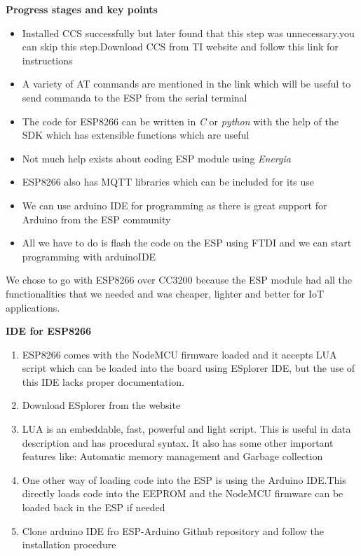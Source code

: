 \documentclass[16pt]{article}
\begin{document}
{\Large{\textbf{Progress stages and key points}}}

\begin{itemize}

\item
  Installed CCS successfully but later found that this step was unnecessary.you can skip this step.Download CCS from TI website and follow this link for instructions
\item
  A variety of AT commands are mentioned in the link which will be
  useful to send commanda to the ESP from the serial terminal
\item
  The code for ESP8266 can be written in \emph{C} or \emph{python} with
  the help of the SDK which has extensible functions which are useful
\item
  Not much help exists about coding ESP module using \emph{Energia}
\item
  ESP8266 also has MQTT libraries which can be included for its use
\item
  We can use arduino IDE for programming as there is great support for
  Arduino from the ESP community
\item
  All we have to do is flash the code on the ESP using FTDI and we can
  start programming with arduinoIDE
  
\end{itemize}

We chose to go with ESP8266 over CC3200 because the ESP module had all
the functionalities that we needed and was cheaper, lighter and better
for IoT applications.

\vspace{5.5cm}

{\LARGE{\textbf{IDE for ESP8266}}}

\begin{enumerate}

\item
  ESP8266 comes with the NodeMCU firmware loaded and it accepts LUA
  script which can be loaded into the board using ESplorer IDE, but the
  use of this IDE lacks proper documentation.
\item
  Download ESplorer from the website 
\item
  LUA is an embeddable, fast, powerful and light script. This is useful in data
  description and has procedural syntax. It also has some other
  important features like: Automatic memory management and Garbage
  collection
\item
  One other way of loading code into the ESP is using the Arduino
  IDE.This directly loads code into the EEPROM and the NodeMCU firmware
  can be loaded back in the ESP if
  needed
\item Clone
  arduino IDE fro ESP-Arduino Github repository and follow
  the installation procedure
\end{enumerate}
\end{document}
